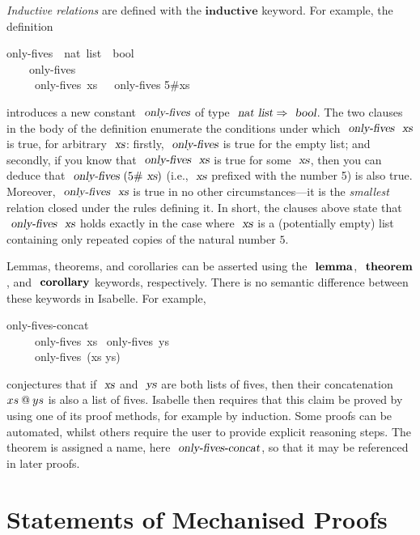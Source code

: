 \documentclass[11pt]{article}
\renewenvironment{isabelle}{%
  \medbreak\noindent\hspace{\parindent}%
  \begin{minipage}{\textwidth-\parindent}%
  \begin{isabellebody}%
  \begin{tabbing}%
}{%
  \end{tabbing}%
  \end{isabellebody}%
  \end{minipage}%
  \medbreak%
}
\begin{document}
\emph{Inductive relations} are defined with the $\mathbf{inductive}$ keyword.
For example, the definition
\begin{isabelle}
 only-fives\ {\isacharcolon}{\isacharcolon}\ {\isachardoublequoteopen}nat\ list\ {\isasymRightarrow}\ bool{\isachardoublequoteclose}\  \\
~~~~{\isachardoublequoteopen}only-fives\ {\isacharbrackleft}{\isacharbrackright}{\isachardoublequoteclose}\ {\isacharbar}\\
~~~~{\isachardoublequoteopen}{\isasymlbrakk}\ only-fives\ xs\ {\isasymrbrakk}\ {\isasymLongrightarrow}\ only-fives {\isacharparenleft}5\#xs{\isacharparenright}{\isachardoublequoteclose}
\end{isabelle}
\noindent %
introduces a new constant $\isa{only-fives}$ of type $\isa{nat list} \Rightarrow \isa{bool}$.
The two clauses in the body of the definition enumerate the conditions under which $\isa{only-fives}\ \isa{xs}$ is true, for arbitrary $\isa{xs}$: firstly, $\isa{only-fives}$ is true for the empty list; and secondly, if you know that $\isa{only-fives}\ \isa{xs}$ is true for some $\isa{xs}$, then you can deduce that $\isa{only-fives}\ (5\#\isa{xs})$ (i.e., $\isa{xs}$ prefixed with the number 5) is also true.
Moreover, $\isa{only-fives}\ \isa{xs}$ is true in no other circumstances---it is the \emph{smallest} relation closed under the rules defining it.
In short, the clauses above state that $\isa{only-fives}\ \isa{xs}$ holds exactly in the case where $\isa{xs}$ is a (potentially empty) list containing only repeated copies of the natural number $5$.

Lemmas, theorems, and corollaries can be asserted using the $\isacommand{lemma}$, $\isacommand{theorem}$, and $\isacommand{corollary}$ keywords, respectively.
There is no semantic difference between these keywords in Isabelle.
For example,
\begin{isabelle}
 only-fives-concat{\isacharcolon} \\
~~~~\ only-fives\ xs \ only-fives\ ys\\
~~~~\ only-fives\ (xs \isacharat ys)
\end{isabelle}
\noindent %
conjectures that if $\isa{xs}$ and $\isa{ys}$ are both lists of fives, then their concatenation $xs \mathbin{\emph{$@$}} ys$ is also a list of fives.
Isabelle then requires that this claim be proved by using one of its proof methods, for example by induction.
Some proofs can be automated, whilst others require the user to provide explicit reasoning steps.
The theorem is assigned a name, here $\isa{only-fives-concat}$, so that it may be referenced in later proofs.

\newpage

\section{Statements of Mechanised Proofs}
\label{sect:appendix:statements}
\end{document}
